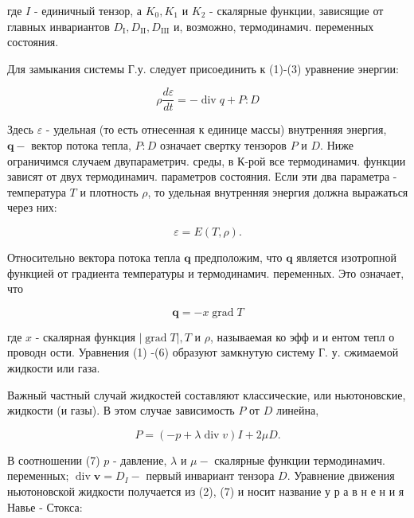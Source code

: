\documentclass[10pt]{article}
\begin{document}
где $I$ - единичный тензор, а $K_{0}, K_{1}$ и $K_{2}$ - скалярные функции, зависящие от главных инвариантов $D_{\mathrm{I}}, D_{\mathrm{II}}, D_{\mathrm{III}}$ и, возможно, термодинамич. переменных состояния.



Для замыкания системы Г.у. следует присоединить к (1)-(3) уравнение энергии:



\[

\rho \frac{d \varepsilon}{d t}=-\operatorname{div} q+P: D

\]



Здесь $\varepsilon$ - удельная (то есть отнесенная к единице массы) внутренняя энергия, $\boldsymbol{q}-$ вектор потока тепла, $P: D$ означает свертку тензоров $P$ и $D$. Ниже ограничимся случаем двупараметрич. среды, в К-рой все термодинамич. функции зависят от двух термодинамич. параметров состояния. Если эти два параметра - температура $T$ и плотность $\rho$, то удельная внутренняя энергия должна выражаться через них:



\[

\varepsilon=E(T, \rho) .

\]



Относительно вектора потока тепла $\boldsymbol{q}$ предположим, что $\boldsymbol{q}$ является изотропной функцией от градиента температуры и термодинамич. переменных. Это означает, что



\[

\boldsymbol{q}=-x \operatorname{grad} T

\]



где $x$ - скалярная функция $|\operatorname{grad} T|, T$ и $\rho$, называемая ко эфф и и ентом тепл о проводн ости. Уравнения (1) -(6) образуют замкнутую систему Г. у. сжимаемой жидкости или газа.



Важный частный случай жидкостей составляют классические, или ньютоновские, жидкости (и газы). В этом случае зависимость $P$ от $D$ линейна,



\[

P=(-p+\lambda \operatorname{div} v) I+2 \mu D .

\]



В соотношении (7) $p$ - давление, $\lambda$ и $\mu-$ скалярные функции термодинамич. переменных; $\operatorname{div} \boldsymbol{v}=D_{I}-$ первый инвариант тензора $D$. Уравнение движения ньютоновской жидкости получается из (2), (7) и носит название у р а в н е н и я Навье - Стокса:
\end{document}
